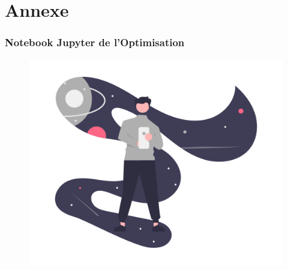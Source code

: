 \documentclass[9pt]{beamer}
\begin{document}
\section{Annexe}
\begin{frame}
	\frametitle{Notebook Jupyter de l’Optimisation}
	\begin{figure}[!htb]
     \centering
     \includegraphics[width=.7\textwidth]{../media/Lost_online}
   \label{Fig:lost_online}
\end{figure}
\end{frame}
\end{document}

